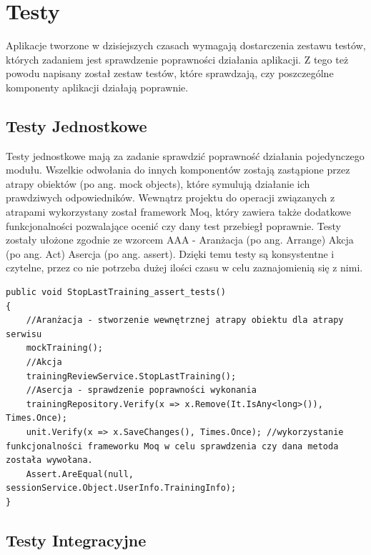 \newpage
{\let\cleardoublepage\relax \chapter{Testy}}


Aplikacje tworzone w dzisiejszych czasach wymagają dostarczenia zestawu testów, których zadaniem jest sprawdzenie poprawności działania aplikacji. Z tego też powodu napisany został zestaw testów, które sprawdzają, czy poszczególne komponenty aplikacji działają poprawnie.

\section{Testy Jednostkowe}

Testy jednostkowe mają za zadanie sprawdzić poprawność działania pojedynczego modułu. Wszelkie odwołania do innych komponentów zostają zastąpione przez atrapy obiektów (po ang. mock objects), które symulują działanie ich prawdziwych odpowiedników.
 Wewnątrz projektu do operacji związanych z atrapami wykorzystany został framework Moq, który zawiera także dodatkowe funkcjonalności pozwalające ocenić czy dany test przebiegł poprawnie.
Testy zostały ułożone zgodnie ze wzorcem AAA\cite{UnitTestingMicrosoft} - Aranżacja (po ang. Arrange) Akcja (po ang. Act) Asercja (po ang. assert).  Dzięki temu testy są konsystentne i czytelne, przez co nie potrzeba dużej ilości czasu w celu zaznajomienią się z nimi.

\begin{lstlisting}[frame=single, numbers=none,captionpos=b, 
caption={Przykładowy test jednostkowy wykorzystujący wzorzec AAA}]
public void StopLastTraining_assert_tests()
{
	//Aranżacja - stworzenie wewnętrznej atrapy obiektu dla atrapy serwisu
	mockTraining();
	//Akcja
	trainingReviewService.StopLastTraining();
	//Asercja - sprawdzenie poprawności wykonania
	trainingRepository.Verify(x => x.Remove(It.IsAny<long>()), Times.Once);
	unit.Verify(x => x.SaveChanges(), Times.Once); //wykorzystanie funkcjonalności frameworku Moq w celu sprawdzenia czy dana metoda została wywołana.
	Assert.AreEqual(null, sessionService.Object.UserInfo.TrainingInfo);
}
\end{lstlisting}

\section{Testy Integracyjne}

